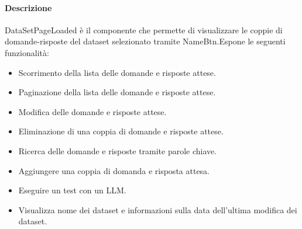 \paragraph{Descrizione}
DataSetPageLoaded è il componente che permette di visualizzare le coppie di domande-risposte del dataset selezionato tramite NameBtn.Espone le seguenti funzionalità:
\begin{itemize}
    \item Scorrimento della lista delle domande e risposte attese.
    \item Paginazione della lista delle domande e risposte attese.
    \item Modifica delle domande e risposte attese.
    \item Eliminazione di una coppia di domande e risposte attese.
    \item Ricerca delle domande e risposte tramite parole chiave.
    \item Aggiungere una coppia di domanda e risposta attesa.
    \item Eseguire un test con un LLM.
    \item Visualizza nome dei dataset e informazioni sulla data dell'ultima modifica dei dataset.
\end{itemize}

